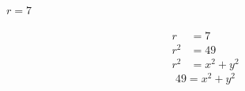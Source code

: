 \begin{problem}[77.]
    $r = 7$
\end{problem}

\begin{solution}
    \begin{align}
        r &= 7 \\
        r^2 &= 49 \\
        r^2 &= x^2 + y^2
    \end{align}
    \[\boxed{49 = x^2 + y^2}\]
\end{solution}